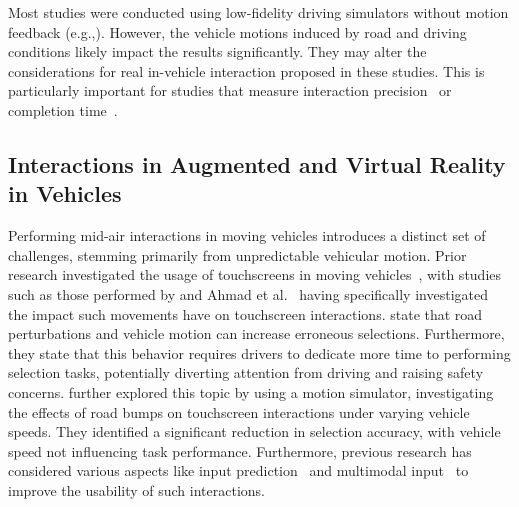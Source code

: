 Most studies were conducted using low-fidelity driving simulators without motion feedback (e.g.,\cite{gomaa_studying_2020, roider_effects_2017, rumelin_free-hand_2013, roiderSeeYourPoint2018, riegler2020gaze}). However, the vehicle motions induced by road and driving conditions likely impact the results significantly. They may alter the considerations for real in-vehicle interaction proposed in these studies. This is particularly important for studies that measure interaction precision~\cite{gomaa_studying_2020} or completion time~\cite{ng2016investigating}.




\subsection{Interactions in Augmented and Virtual Reality in Vehicles}


Performing mid-air interactions in moving vehicles introduces a distinct set of challenges, stemming primarily from unpredictable vehicular motion. Prior research investigated the usage of touchscreens in moving vehicles~\cite{ahmadInteractiveDisplaysVehicles2014, ahmadTouchscreenUsabilityInput2015, mayerEffectRoadBumps2018, aslanLeapTouchProximity2015, pampelFittsGoesAutobahn2019}, with studies such as those performed by \citet{mayerEffectRoadBumps2018} and Ahmad et al.~\cite{ahmadInteractiveDisplaysVehicles2014, ahmadTouchscreenUsabilityInput2015} having specifically investigated the impact such movements have on touchscreen interactions. \citet{ahmadInteractiveDisplaysVehicles2014} state that road perturbations and vehicle motion can increase erroneous selections. Furthermore, they state that this behavior requires drivers to dedicate more time to performing selection tasks, potentially diverting attention from driving and raising safety concerns. \citet{mayerEffectRoadBumps2018} further explored this topic by using a motion simulator, investigating the effects of road bumps on touchscreen interactions under varying vehicle speeds. They identified a significant reduction in selection accuracy, with vehicle speed not influencing task performance. Furthermore, previous research has considered various aspects like input prediction~\cite{ahmadInteractiveDisplaysVehicles2014, mayerEffectRoadBumps2018} and multimodal input~\cite{roiderSeeYourPoint2018} to improve the usability of such interactions.

